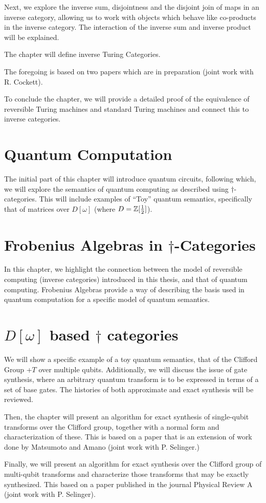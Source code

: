 Next, we explore the inverse sum, disjointness and the disjoint join of maps in an inverse
category, allowing us to work with objects which behave like co-products in the inverse category.
The interaction of the inverse sum and inverse product will be explained.

The chapter will define inverse Turing Categories.

The foregoing is based on two papers which are in preparation (joint work with R. Cockett).

To conclude the chapter, we will provide a detailed proof of the equivalence of reversible Turing
machines and standard Turing machines and connect this to inverse categories.

\section*{Quantum Computation}
The initial part of this chapter will introduce quantum circuits, following which, we will explore
the semantics of quantum computing as described using $\dagger$-categories. This will include
examples of ``Toy'' quantum semantics, specifically that of matrices over $D[\omega]$ (where
$D = \mathbb{Z}[\frac{1}{2}]$).

\section*{Frobenius Algebras in $\dagger$-Categories}

In this chapter, we highlight the connection between the model of reversible computing (inverse
categories) introduced in this thesis, and that of quantum computing. Frobenius Algebras provide a
way of describing the basis used in quantum computation for a specific model of quantum semantics.


\section*{$D[\omega]$ based $\dagger$ categories}

We will show a specific example of a toy quantum semantics, that of the Clifford Group +$T$ over
multiple qubits. Additionally, we will discuss the issue of gate synthesis, where an arbitrary
quantum transform is to be expressed in terms of a set of base gates. The histories of both
approximate and exact synthesis will be reviewed.

Then, the chapter will present an algorithm for exact synthesis of single-qubit transforms over the
Clifford group, together with a normal form and characterization of these. This is based on a paper
that is an extension of work done by Matsumoto and Amano (joint work with P. Selinger.)

Finally, we will present an algorithm for exact synthesis over the Clifford group of multi-qubit
transforms and characterize those transforms that may be exactly synthesized. This based on a paper
published in the journal Physical Review A (joint work with P. Selinger).

